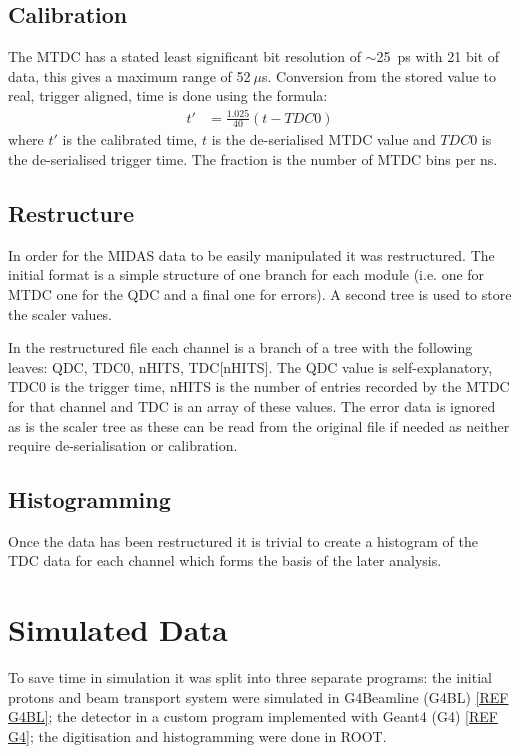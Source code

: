 \documentclass[]{article}
\newcommand{\ms}{$~\mu$s}
\begin{document}
\subsection{Calibration} %
\label{sub:calibration}
The MTDC has a stated least significant bit resolution of $\sim$25~ps with 21 bit of data, this gives a maximum range of 52\ms{}. Conversion from the stored value to real, trigger aligned, time is done using the formula:
\begin{align}\label{equ:tdc_calibration}
    t'   &= \frac{1.025}{40}(t - TDC0)
\end{align}
where $t'$ is the calibrated time, $t$ is the de-serialised MTDC value and $TDC0$ is the de-serialised trigger time. The fraction is the number of MTDC bins per ns.
\subsection{Restructure} %
\label{sub:restructure}
In order for the MIDAS data to be easily manipulated it was restructured. The initial format is a simple structure of one branch for each module (i.e. one for MTDC one for the QDC and a final one for errors). A second tree is used to store the scaler values. 

In the restructured file each channel is a branch of a tree with the following leaves: QDC, TDC0, nHITS, TDC[nHITS]. The QDC value is self-explanatory, TDC0 is the trigger time, nHITS is the number of entries recorded by the MTDC for that channel and TDC is an array of these values. The error data is ignored as is the scaler tree as these can be read from the original file if needed as neither require de-serialisation or calibration.
\subsection{Histogramming} %
\label{sub:Histogramming}
Once the data has been restructured it is trivial to create a histogram of the TDC data for each channel which forms the basis of the later analysis.
\section{Simulated Data} %
\label{sec:simulated_data}
To save time in simulation it was split into three separate programs: the initial protons and beam transport system were simulated in G4Beamline (G4BL) \ref{REF G4BL}; the detector in a custom program implemented with Geant4 (G4) \ref{REF G4}; the digitisation and histogramming were done in ROOT.
\end{document}
